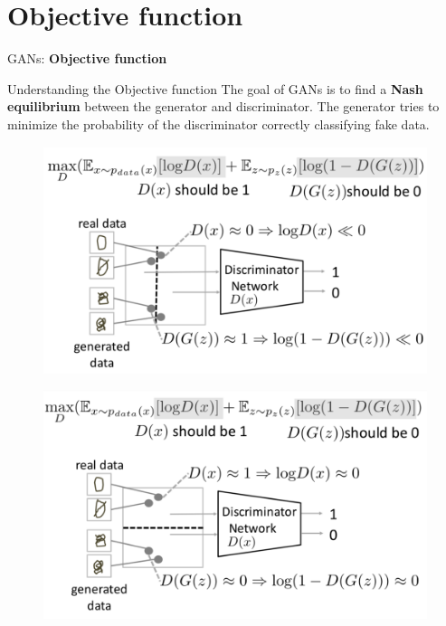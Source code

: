 \section{Objective function}
\begin{frame}{}
    \LARGE GANs: \textbf{Objective function}
\end{frame}

\begin{frame}[allowframebreaks]{Understanding the Objective function}
The goal of GANs is to find a \textbf{Nash equilibrium} between the generator and discriminator. 
The generator tries to minimize the probability of the discriminator correctly classifying fake data.
\begin{figure}
    \centering
    \includegraphics[height=0.7\textheight, width=\textwidth, keepaspectratio]{images/gan/gan_cost_1.png}
\end{figure}

\framebreak
\begin{figure}
    \centering
    \includegraphics[height=0.9\textheight, width=\textwidth, keepaspectratio]{images/gan/gan_cost_2.png}
\end{figure}


\end{frame}
